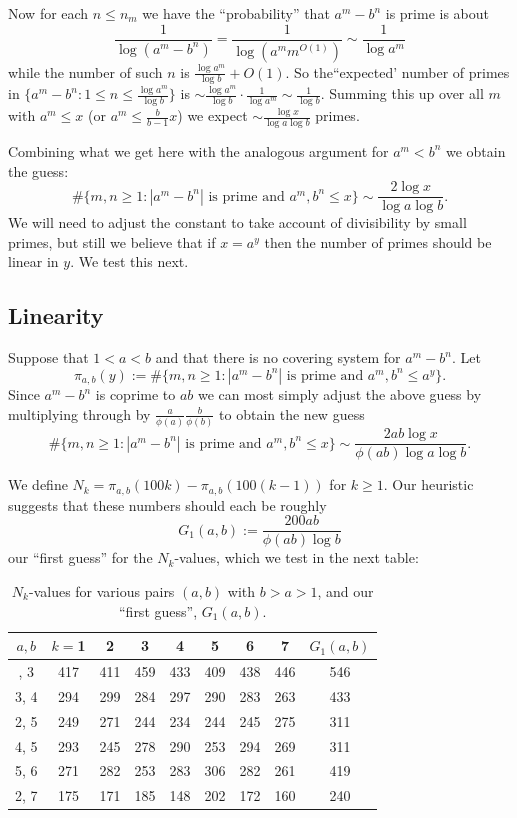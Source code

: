 \documentclass[12pt, a4paper,  reqno, english]{amsart}%
\numberwithin{equation}{section}
\theoremstyle{definition}
\renewcommand{\leq}{\leqslant}
\renewcommand{\geq}{\geqslant}
\begin{document}
Now for each $n\leq n_m$ we have the ``probability'' that $a^m-b^n$ is prime is about
\[
\frac 1{\log (a^m-b^n)} = \frac 1{\log (a^mm^{O(1)})} \sim  \frac 1{\log a^m}
\]
while the number of such $n$ is $\frac{\log a^m}{\log b}+O(1)$. So the``expected'  number of primes in
$\{ a^m-b^n: 1\leq n\leq \frac{\log a^m}{\log b}\}$ is $\sim \frac{\log a^m}{\log b}\cdot  \frac 1{\log a^m}\sim \frac 1{\log b}$.
Summing this up over all $m$ with $a^m\leq x$ (or $a^m\leq \frac b{b-1} x$) we expect $\sim \frac{\log x}{\log a \log b}$ primes. 

Combining what we get here with the analogous argument for $a^m<b^n$ we obtain the guess:
\[
\#\{ m,n\geq 1: |a^m-b^n| \text{ is prime and } a^m, b^n\leq x\} \sim  \frac{2\log x}{\log a \log b}.
\]
We will need to adjust the constant to take account of divisibility by small primes, but still we believe that if $x=a^y$ then the number of primes should be linear in $y$. We test this next.


\subsection{Linearity}

Suppose that $1<a<b$ and that there is no covering system for $a^m-b^n$. Let
\[
\pi_{a,b}(y):=\# \{  m,n\geq 1: |a^m-b^n| \text{ is prime and } a^m, b^n\leq a^y\} .
\]
Since $a^m-b^n$ is coprime to $ab$ we can most simply adjust the above guess by multiplying through by $\frac a{\phi(a)} \frac b{\phi(b)} $ to obtain the new guess
\[
\#\{ m,n\geq 1: |a^m-b^n| \text{ is prime and } a^m, b^n\leq x\} \sim  \frac{2ab \log x}{\phi(ab) \log a \log b}.
\]

We define $N_k=\pi_{a,b}(100k)-\pi_{a,b}(100(k-1))$ for $k\geq 1$. Our heuristic suggests  that these numbers should each be roughly 
\[
G_1(a,b):= \frac{200ab }{\phi(ab) \log b}
\]
 our ``first guess'' for the $N_k$-values, which we test in the next table:
\begin{table}[ht]
\begin{center}
\begin{tabular}{|  c | c c c c c c c | c |}
\hline\newline
 $a,b$  & $k=$1 & 2 & 3 & 4 & 5 & 6 & 7 & $G_1(a,b)$\\
\hline\newline
2, 3 & 417 & 411 & 459 & 433 & 409 & 438 & 446 & 546 \\
3, 4 & 294 & 299 & 284 & 297 & 290 & 283 & 263&  433 \\
2, 5 & 249 & 271 & 244 & 234 & 244 & 245 & 275 & 311\\
4, 5 & 293 & 245 & 278 & 290 & 253 & 294 & 269 & 311\\
5, 6 & 271 & 282 & 253 & 283 & 306 & 282 & 261 & 419\\
2, 7& 175 & 171 & 185 & 148 & 202 & 172 & 160& 240\\
\hline 
\end{tabular}
    \end{center} \smallskip
    \caption{$N_k$-values for various pairs $(a,b)$ with $b>a>1$, and our ``first guess'', $G_1(a,b)$.}
    \end{table}
  
\end{document}
